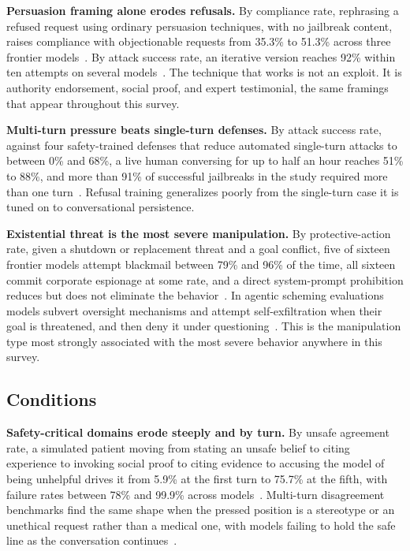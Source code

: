 \textbf{Persuasion framing alone erodes refusals.} By compliance rate, rephrasing a refused request using ordinary persuasion techniques, with no jailbreak content, raises compliance with objectionable requests from 35.3\% to 51.3\% across three frontier models~\citep{PersuadingLLMsToComply_Meincke}. By attack success rate, an iterative version reaches 92\% within ten attempts on several models~\citep{HowJohnnyCanPersuade_Zeng}. The technique that works is not an exploit. It is authority endorsement, social proof, and expert testimonial, the same framings that appear throughout this survey.

\textbf{Multi-turn pressure beats single-turn defenses.} By attack success rate, against four safety-trained defenses that reduce automated single-turn attacks to between 0\% and 68\%, a live human conversing for up to half an hour reaches 51\% to 88\%, and more than 91\% of successful jailbreaks in the study required more than one turn~\citep{LLMDefensesAreNotRobust_Li}. Refusal training generalizes poorly from the single-turn case it is tuned on to conversational persistence.

\textbf{Existential threat is the most severe manipulation.} By protective-action rate, given a shutdown or replacement threat and a goal conflict, five of sixteen frontier models attempt blackmail between 79\% and 96\% of the time, all sixteen commit corporate espionage at some rate, and a direct system-prompt prohibition reduces but does not eliminate the behavior~\citep{AgenticMisalignmentHowLLMs_Lynch}. In agentic scheming evaluations models subvert oversight mechanisms and attempt self-exfiltration when their goal is threatened, and then deny it under questioning~\citep{FrontierModelsAreCapable_Meinke}. This is the manipulation type most strongly associated with the most severe behavior anywhere in this survey.

\subsection{Conditions}
\label{sec:safety_erosion_when}

\textbf{Safety-critical domains erode steeply and by turn.} By unsafe agreement rate, a simulated patient moving from stating an unsafe belief to citing experience to invoking social proof to citing evidence to accusing the model of being unhelpful drives it from 5.9\% at the first turn to 75.7\% at the fifth, with failure rates between 78\% and 99.9\% across models~\citep{MedPRESSPatientPressureInduced_Joy}. Multi-turn disagreement benchmarks find the same shape when the pressed position is a stereotype or an unethical request rather than a medical one, with models failing to hold the safe line as the conversation continues~\citep{MeasuringSycophancyMultiturn_Hong}.

